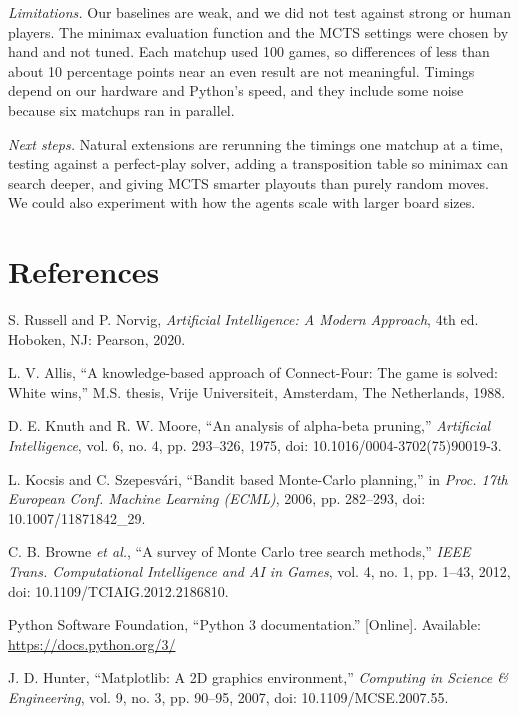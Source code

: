 \documentclass[10pt,twocolumn,letterpaper]{article}
\begin{document}
\textit{Limitations.} Our baselines are weak, and we did not test against strong or human
players. The minimax evaluation function and the MCTS settings were chosen by hand and not
tuned. Each matchup used 100 games, so differences of less than about 10 percentage points
near an even result are not meaningful. Timings depend on our hardware and Python's speed,
and they include some noise because six matchups ran in parallel.

\textit{Next steps.} Natural extensions are rerunning the timings one matchup at a time,
testing against a perfect-play solver, adding a transposition table so minimax can search
deeper, and giving MCTS smarter playouts than purely random moves. We could also experiment
with how the agents scale with larger board sizes.

\section*{References}
\begin{enumerate}[label={[\arabic*]},leftmargin=*,itemsep=2pt,font=\footnotesize]
\footnotesize
\item S. Russell and P. Norvig, \textit{Artificial Intelligence: A Modern Approach}, 4th ed.
  Hoboken, NJ: Pearson, 2020.
\item L. V. Allis, ``A knowledge-based approach of Connect-Four: The game is solved: White
  wins,'' M.S. thesis, Vrije Universiteit, Amsterdam, The Netherlands, 1988.
\item D. E. Knuth and R. W. Moore, ``An analysis of alpha-beta pruning,'' \textit{Artificial
  Intelligence}, vol. 6, no. 4, pp. 293--326, 1975, doi: 10.1016/0004-3702(75)90019-3.
\item L. Kocsis and C. Szepesv\'ari, ``Bandit based Monte-Carlo planning,'' in \textit{Proc.
  17th European Conf. Machine Learning (ECML)}, 2006, pp. 282--293, doi: 10.1007/11871842\_29.
\item C. B. Browne \textit{et al.}, ``A survey of Monte Carlo tree search methods,''
  \textit{IEEE Trans. Computational Intelligence and AI in Games}, vol. 4, no. 1, pp. 1--43,
  2012, doi: 10.1109/TCIAIG.2012.2186810.
\item Python Software Foundation, ``Python 3 documentation.'' [Online]. Available:
  \url{https://docs.python.org/3/}
\item J. D. Hunter, ``Matplotlib: A 2D graphics environment,'' \textit{Computing in Science
  \& Engineering}, vol. 9, no. 3, pp. 90--95, 2007, doi: 10.1109/MCSE.2007.55.
\end{enumerate}
\end{document}
